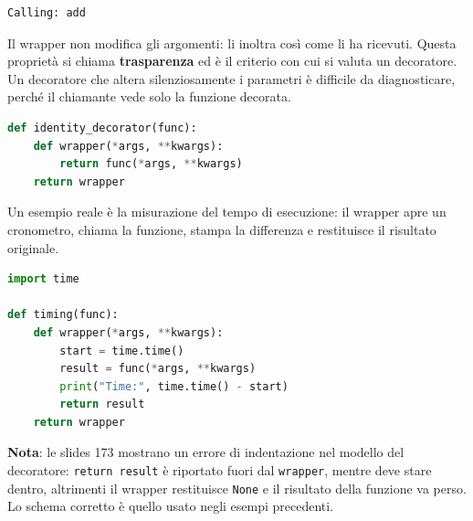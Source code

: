 \documentclass[12pt]{extarticle}
\begin{document}
\begin{lstlisting}[numbers=none]
Calling: add
\end{lstlisting}

\noindent Il wrapper non modifica gli argomenti: li inoltra così come li ha ricevuti. Questa proprietà si chiama \textbf{trasparenza} ed è il criterio con cui si valuta un decoratore. Un decoratore che altera silenziosamente i parametri è difficile da diagnosticare, perché il chiamante vede solo la funzione decorata.

\begin{lstlisting}[language=Python]
def identity_decorator(func):
    def wrapper(*args, **kwargs):
        return func(*args, **kwargs)
    return wrapper
\end{lstlisting}

\noindent Un esempio reale è la misurazione del tempo di esecuzione: il wrapper apre un cronometro, chiama la funzione, stampa la differenza e restituisce il risultato originale.

\begin{lstlisting}[language=Python]
import time

def timing(func):
    def wrapper(*args, **kwargs):
        start = time.time()
        result = func(*args, **kwargs)
        print("Time:", time.time() - start)
        return result
    return wrapper
\end{lstlisting}

\noindent \textbf{Nota}: le slides 173 mostrano un errore di indentazione nel modello del decoratore: \texttt{return result} è riportato fuori dal \texttt{wrapper}, mentre deve stare dentro, altrimenti il wrapper restituisce \texttt{None} e il risultato della funzione va perso. Lo schema corretto è quello usato negli esempi precedenti.
\end{document}
